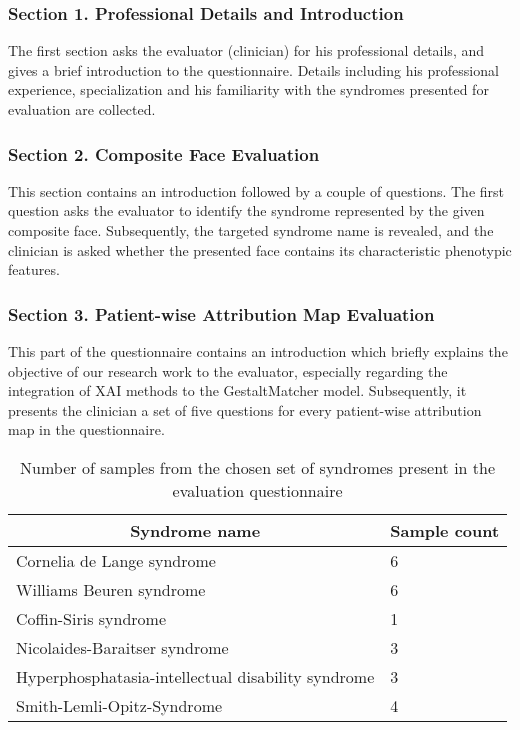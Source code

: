 \documentclass[../report.tex]{subfiles}
\begin{document}
   \subsubsection{Section 1. Professional Details and Introduction}
   The first section asks the evaluator (clinician) for his professional details, and gives a brief introduction to the questionnaire. Details including his professional experience, specialization and his familiarity with the syndromes presented for evaluation are collected. 
    
    
   \subsubsection{Section 2. Composite Face Evaluation}
   This section contains an introduction followed by a couple of questions. The first question asks the evaluator to identify the syndrome represented by the given composite face. Subsequently, the targeted syndrome name is revealed, and the clinician is asked whether the presented face contains its characteristic phenotypic features.
    
   \subsubsection{Section 3. Patient-wise Attribution Map Evaluation}
   This part of the questionnaire contains an introduction which briefly explains the objective of our research work to the evaluator, especially regarding the integration of XAI methods to the GestaltMatcher model. Subsequently, it presents the clinician a set of five questions for every patient-wise attribution map in the questionnaire.
   \begin{table}[H]
   	\centering
   	\begin{tabular}{|l|l|}
   		\hline
   		\multicolumn{1}{|c|}{\textbf{Syndrome name}}       & \multicolumn{1}{c|}{\textbf{Sample count}} \\ \hline
   		Cornelia de Lange syndrome                         & 6                                          \\ \hline
   		Williams Beuren syndrome                           & 6                                          \\ \hline
   		Coffin-Siris syndrome                              & 1                                          \\ \hline
   		Nicolaides-Baraitser syndrome                      & 3                                          \\ \hline
   		Hyperphosphatasia-intellectual disability syndrome & 3                                          \\ \hline
   		Smith-Lemli-Opitz-Syndrome                         & 4                                          \\ \hline
   	\end{tabular}
   	\caption{Number of samples from the chosen set of syndromes present in the evaluation questionnaire}
   \end{table}
\end{document}
